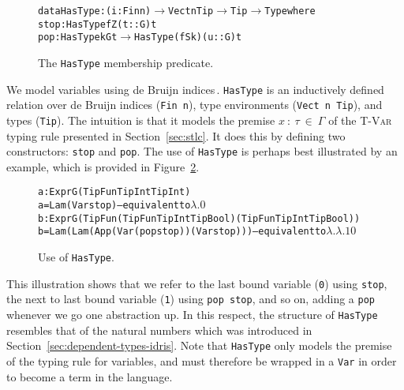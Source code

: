 \begin{figure}
\begin{alltt}
  data HasType : (i : Fin n) \(\to\) Vect n Tip \(\to\) Tip \(\to\) Type where
    stop : HasType fZ (t :: G) t
    pop  : HasType k G t \(\to\) HasType (fS k) (u :: G) t
\end{alltt}
\caption{The \texttt{HasType} membership predicate.}
\label{fig:HasType}
\end{figure}

We model variables using de Bruijn indices\,\cite{Bruijn72lambdacalculus}. \texttt{HasType} is an inductively defined relation over de Bruijn indices (\texttt{Fin n}), type environments (\texttt{Vect n Tip}), and types (\texttt{Tip}). The intuition is that it models the premise $x~:~\tau~\in~\Gamma$ of the \textsc{T-Var} typing rule presented in Section~\ref{sec:stlc}. It does this by defining two constructors: \texttt{stop} and \texttt{pop}. The use of \texttt{HasType} is perhaps best illustrated by an example, which is provided in Figure~\ref{fig:HasType-use}. 

\begin{figure}
\begin{alltt}
  a : Expr G (TipFun TipInt TipInt)
  a = Lam (Var stop)                              -- equivalent to \(\lambda.0\)
  b : Expr G (TipFun (TipFun TipInt TipBool) (TipFun TipInt TipBool))
  b = Lam (Lam (App (Var (pop stop)) (Var stop))) -- equivalent to \(\lambda.\lambda.1 0\)
\end{alltt}
\caption{Use of \texttt{HasType}.}
\label{fig:HasType-use}
\end{figure}

This illustration shows that we refer to the last bound variable (\texttt{0}) using \texttt{stop}, the next to last bound variable (\texttt{1}) using \texttt{pop stop}, and so on, adding a \texttt{pop} whenever we go one abstraction up. In this respect, the structure of \texttt{HasType} resembles that of the natural numbers which was introduced in Section~\ref{sec:dependent-types-idris}. Note that \texttt{HasType} only models the premise of the typing rule for variables, and must therefore be wrapped in a \texttt{Var} in order to become a term in the language.

